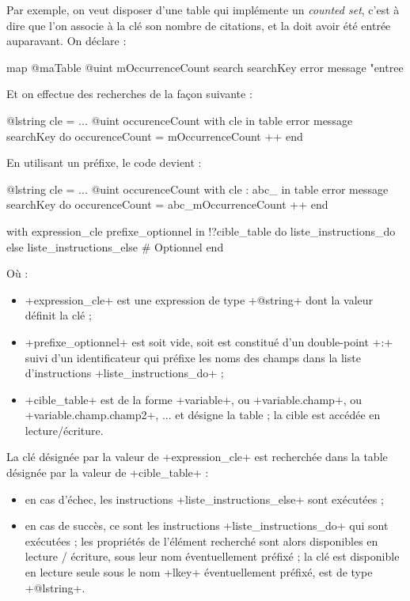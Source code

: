Par exemple, on veut disposer d'une table qui implémente un \emph{counted set}, c'est à dire que l'on associe à la clé son nombre de citations, et la doit avoir été entrée auparavant. On déclare :
\begin{galgas}
map @maTable {
  @uint mOccurrenceCount
  search searchKey error message "entree %
}
\end{galgas}

Et on effectue des recherches de la façon suivante :
\begin{galgas}
@lstring cle = ...
@uint occurenceCount
with cle in table error message searchKey do
  occurenceCount = mOccurrenceCount ++
end
\end{galgas}

En utilisant un préfixe, le code devient :
\begin{galgas}
@lstring cle = ...
@uint occurenceCount
with cle : abc_ in table error message searchKey do
  occurenceCount = abc_mOccurrenceCount ++
end
\end{galgas}







\begin{galgas}
with expression_cle prefixe_optionnel in !?cible_table
do
  liste_instructions_do
else
  liste_instructions_else # Optionnel
end
\end{galgas}


Où :
\begin{itemize}
  \item \ggs+expression_cle+ est une expression de type \ggs+@string+ dont la valeur définit la clé ;
  \item \ggs+prefixe_optionnel+ est soit vide, soit est constitué d'un double-point \ggs+:+ suivi d'un identificateur qui préfixe les noms des champs dans la liste d'instructions \ggs+liste_instructions_do+ ;
  \item \ggs+cible_table+ est de la forme \ggs+variable+, ou  \ggs+variable.champ+, ou \ggs+variable.champ.champ2+, ... et désigne la table ; la cible est accédée en lecture/écriture.
\end{itemize}

La clé désignée par la valeur de \ggs+expression_cle+ est recherchée dans la table désignée par la valeur de \ggs+cible_table+ :
\begin{itemize}
  \item en cas d'échec, les instructions \ggs+liste_instructions_else+ sont exécutées ;
  \item en cas de succès, ce sont les instructions \ggs+liste_instructions_do+ qui sont exécutées ; les propriétés de l'élément recherché sont alors disponibles en lecture / écriture, sous leur nom éventuellement préfixé ; la clé est disponible en lecture seule sous le nom \ggs+lkey+ éventuellement préfixé, est de type \ggs+@lstring+.
\end{itemize}

